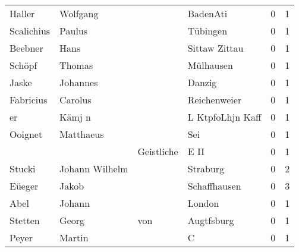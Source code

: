 \begin{center}
\begin{tiny}
\begin{longtabu}{llllrr}
                   Haller &                           Wolfgang &             &                                    BadenAti &          0 &         1 \\
               Scalichius &                             Paulus &             &                                    Tübingen &          0 &         1 \\
                  Beebner &                               Hans &             &                               Sittaw Zittau &          0 &         1 \\
                   Schöpf &                             Thomas &             &                                   Mülhausen &          0 &         1 \\
                    Jaske &                           Johannes &             &                                      Danzig &          0 &         1 \\
                Fabricius &                            Carolus &             &                                Reichenweier &          0 &         1 \\
                       er &                             Kämj n &             &                            L KtpfoLhjn Kaff &          0 &         1 \\
                  Ooignet &                          Matthaeus &             &                                         Sei &          0 &         1 \\
                          &                                    &  Geistliche &                                        E II &          0 &         1 \\
                   Stucki &                     Johann Wilhelm &             &                                    Straburg &          0 &         2 \\
                   Eüeger &                              Jakob &             &                                Schaffhausen &          0 &         3 \\
                     Abel &                             Johann &             &                                      London &          0 &         1 \\
                  Stetten &                              Georg &         von &                                  Augtfsburg &          0 &         1 \\
                    Peyer &                             Martin &             &                                           C &          0 &         1 \\

\end{longtabu}
\end{tiny}
\end{center}
